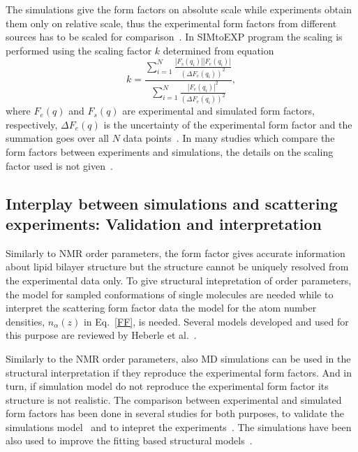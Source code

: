 \documentclass[aps,prl,superscriptaddress,twocolumn]{revtex4}
\begin{document}
The simulations give the form factors on absolute scale while experiments obtain them only on relative scale,
thus the experimental form factors from different sources has to be scaled for comparison~\cite{kucerka08,kucerka10}.
In SIMtoEXP program the scaling is performed using the scaling factor $k$ determined from equation
\begin{equation}
k=\frac{\sum_{i=1}^N\frac{|F_s(q_i)||F_e(q_i)|}{(\Delta F_e(q_i))^2}}{\sum_{i=1}^N\frac{|F_e(q_i)|^2}{(\Delta F_e(q_i))^2}},
\end{equation} 
where $F_e(q)$ and $F_s(q)$ are experimental and simulated form factors, respectively, $\Delta F_e(q)$ is the uncertainty
of the experimental form factor and the summation goes over all $N$ data points~\cite{kucerka08,kucerka10}.
In many studies which compare the form factors between experiments and simulations, the details on the scaling
factor used is not given~\cite{??}. 

\onecolumngrid
{}
\twocolumngrid

\subsection{Interplay between simulations and scattering experiments: Validation and interpretation}
Similarly to NMR order parameters, the form factor gives accurate information about lipid
bilayer structure but the structure cannot be uniquely resolved from the experimental data only.
To give structural intepretation of order parameters, the model for sampled conformations of 
single molecules are needed while to interpret the scattering form factor data the model
for the atom number densities, $n_\alpha(z)$ in Eq.~\ref{FF}, is needed.
Several models developed and used for this purpose are reviewed by Heberle et al.~\cite{heberle12}.

Similarly to the NMR order parameters, also MD simulations can be used in the structural
interpretation if they reproduce the experimental form factors. And in turn,
if simulation model do not reproduce the experimental form factor its structure is not 
realistic. The comparison between experimental and simulated form factors has been done 
in several studies for both purposes, to validate the simulations model~\cite{??} and to
intepret the experiments~\cite{??}. The simulations have been also used to improve the 
fitting based structural models~\cite{??}.
\end{document}
